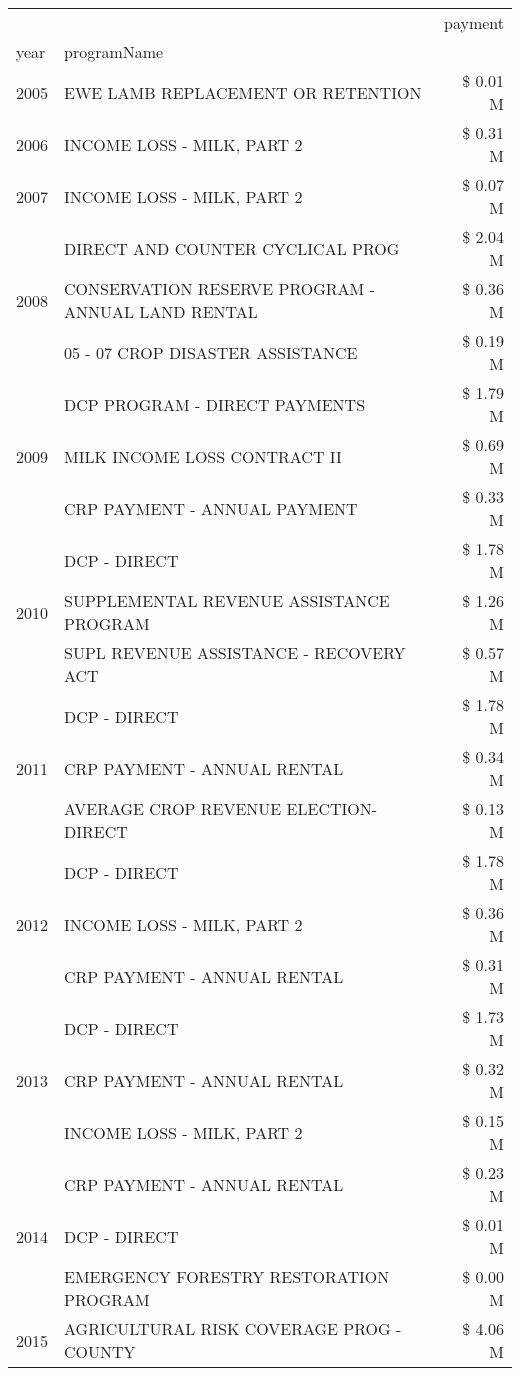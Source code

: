 \begin{tabular}{llr}
\toprule
 &  & payment \\
year & programName &  \\
\midrule
2005 & EWE LAMB REPLACEMENT OR RETENTION & \$ 0.01 M \\
\cline{1-3}
2006 & INCOME LOSS - MILK, PART 2 & \$ 0.31 M \\
\cline{1-3}
2007 & INCOME LOSS - MILK, PART 2 & \$ 0.07 M \\
\cline{1-3}
\multirow[t]{3}{*}{2008} & DIRECT AND COUNTER CYCLICAL PROG & \$ 2.04 M \\
 & CONSERVATION RESERVE PROGRAM - ANNUAL LAND RENTAL & \$ 0.36 M \\
 & 05 - 07 CROP DISASTER ASSISTANCE & \$ 0.19 M \\
\cline{1-3}
\multirow[t]{3}{*}{2009} & DCP PROGRAM - DIRECT PAYMENTS & \$ 1.79 M \\
 & MILK INCOME LOSS CONTRACT II & \$ 0.69 M \\
 & CRP PAYMENT - ANNUAL PAYMENT & \$ 0.33 M \\
\cline{1-3}
\multirow[t]{3}{*}{2010} & DCP - DIRECT & \$ 1.78 M \\
 & SUPPLEMENTAL REVENUE ASSISTANCE PROGRAM & \$ 1.26 M \\
 & SUPL REVENUE ASSISTANCE - RECOVERY ACT & \$ 0.57 M \\
\cline{1-3}
\multirow[t]{3}{*}{2011} & DCP - DIRECT & \$ 1.78 M \\
 & CRP PAYMENT - ANNUAL RENTAL & \$ 0.34 M \\
 & AVERAGE CROP REVENUE ELECTION-DIRECT & \$ 0.13 M \\
\cline{1-3}
\multirow[t]{3}{*}{2012} & DCP - DIRECT & \$ 1.78 M \\
 & INCOME LOSS - MILK, PART 2 & \$ 0.36 M \\
 & CRP PAYMENT - ANNUAL RENTAL & \$ 0.31 M \\
\cline{1-3}
\multirow[t]{3}{*}{2013} & DCP - DIRECT & \$ 1.73 M \\
 & CRP PAYMENT - ANNUAL RENTAL & \$ 0.32 M \\
 & INCOME LOSS - MILK, PART 2 & \$ 0.15 M \\
\cline{1-3}
\multirow[t]{3}{*}{2014} & CRP PAYMENT - ANNUAL RENTAL & \$ 0.23 M \\
 & DCP - DIRECT & \$ 0.01 M \\
 & EMERGENCY FORESTRY RESTORATION PROGRAM & \$ 0.00 M \\
\cline{1-3}
\multirow[t]{3}{*}{2015} & AGRICULTURAL RISK COVERAGE PROG - COUNTY & \$ 4.06 M \\

\end{tabular}
